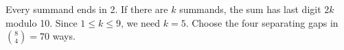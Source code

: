 Every summand ends in 2. If there are $k$ summands, the sum has last digit $2k$ modulo 10. Since $1\le k\le9$, we need $k=5$. Choose the four separating gaps in $\binom84=\boxed{70}$ ways.
